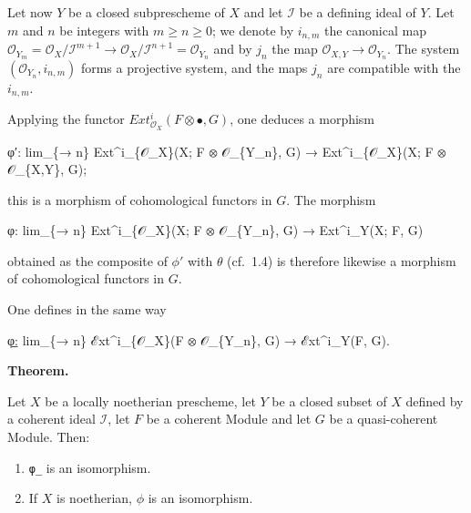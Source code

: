 \documentclass[
  11pt,
  a4paper,
]{book}
\newenvironment{Shaded}{}{}
\newcommand{\NormalTok}[1]{#1}
\begin{document}
Let now \(Y\) be a closed subprescheme of \(X\) and let \(\mathcal{I}\)
be a defining ideal of \(Y\). Let \(m\) and \(n\) be integers with
\(m \geqslant n \geqslant 0\); we denote by \(i_{n,m}\) the canonical
map \(\mathcal{O}_{Y_{m}} =
\mathcal{O}_{X}/\mathcal{I}^{m+1} \to \mathcal{O}_{X}/\mathcal{I}^{n+1} = \mathcal{O}_{Y_{n}}\)
and by \(j_{n}\) the map \(\mathcal{O}_{X,Y} \to \mathcal{O}_{Y_{n}}\).
The system \((\mathcal{O}_{Y_{n}}, i_{n,m})\) forms a projective system,
and the maps \(j_{n}\) are compatible with the \(i_{n,m}\).

Applying the functor
\(Ext^{i}_{\mathcal{O}_{X}}(F \otimes \bullet, G)\), one deduces a
morphism

\begin{Shaded}
\begin{Highlighting}[]
\NormalTok{φ′: lim\_\{→ n\} Ext\^{}i\_\{𝒪\_X\}(X; F ⊗ 𝒪\_\{Y\_n\}, G) → Ext\^{}i\_\{𝒪\_X\}(X; F ⊗ 𝒪\_\{X,Y\}, G);}
\end{Highlighting}
\end{Shaded}

this is a morphism of cohomological functors in \(G\). The morphism

\begin{Shaded}
\begin{Highlighting}[]
\NormalTok{φ: lim\_\{→ n\} Ext\^{}i\_\{𝒪\_X\}(X; F ⊗ 𝒪\_\{Y\_n\}, G) → Ext\^{}i\_Y(X; F, G)}
\end{Highlighting}
\end{Shaded}

obtained as the composite of \(\phi'\) with \(\theta\) (cf.~1.4) is
therefore likewise a morphism of cohomological functors in \(G\).

One defines in the same way

\begin{Shaded}
\begin{Highlighting}[]
\NormalTok{φ̲: lim\_\{→ n\} ℰxt\^{}i\_\{𝒪\_X\}(F ⊗ 𝒪\_\{Y\_n\}, G) → ℰxt\^{}i\_Y(F, G).}
\end{Highlighting}
\end{Shaded}

\textbf{Theorem.}

Let \(X\) be a locally noetherian prescheme, let \(Y\) be a closed
subset of \(X\) defined by a coherent ideal \(\mathcal{I}\), let \(F\)
be a coherent Module and let \(G\) be a quasi-coherent Module. Then:

\begin{enumerate}
\def\labelenumi{\alph{enumi})}
\item
  \texttt{φ̲} is an isomorphism.
\item
  If \(X\) is noetherian, \(\phi\) is an isomorphism.
\end{enumerate}
\end{document}
